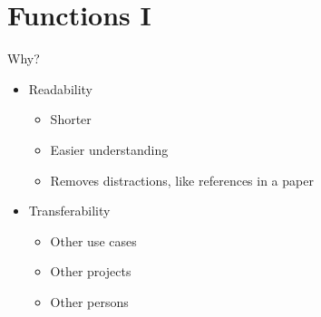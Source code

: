 \documentclass[xcolor=table]{beamer}\usepackage[]{graphicx}\usepackage[]{color}
\makeatletter
\newcommand{\hlnum}[1]{\textcolor[rgb]{0.502,0,0.502}{\textbf{#1}}}%
\newcommand{\hlcom}[1]{\textcolor[rgb]{1,0.502,0}{#1}}%
\newcommand{\hlopt}[1]{\textcolor[rgb]{1,0,0.502}{\textbf{#1}}}%
\newcommand{\hlstd}[1]{\textcolor[rgb]{0,0,0}{#1}}%
\newcommand{\hlkwd}[1]{\textcolor[rgb]{0,0.267,0.4}{#1}}%
\newenvironment{kframe}{%
 \def\at@end@of@kframe{}%
 \ifinner\ifhmode%
  \def\at@end@of@kframe{\end{minipage}}%
  \begin{minipage}{\columnwidth}%
 \fi\fi%
 \def\FrameCommand##1{\hskip\@totalleftmargin \hskip-\fboxsep
 \colorbox{shadecolor}{##1}\hskip-\fboxsep
     \hskip-\linewidth \hskip-\@totalleftmargin \hskip\columnwidth}%
 \MakeFramed {\advance\hsize-\width
   \@totalleftmargin\z@ \linewidth\hsize
   \@setminipage}}%
 {\par\unskip\endMakeFramed%
 \at@end@of@kframe}
\makeatother
\begin{document}
\section{Functions I}
\begin{frame}{Why?}
\begin{itemize}
  \item Readability
  \begin{itemize}
    \item Shorter
    \item Easier understanding
    \item Removes distractions, like references in a paper
  \end{itemize}
  \item Transferability
  \begin{itemize}
    \item Other use cases
    \item Other projects
    \item Other persons
  \end{itemize}
\end{itemize}
\end{frame}


\end{document}
